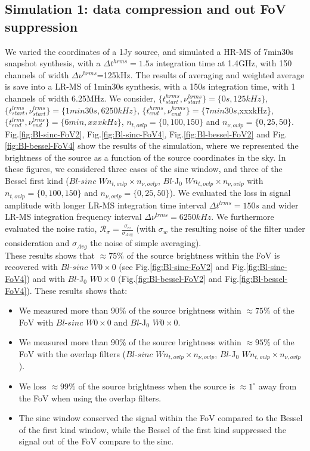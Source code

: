 \documentclass[useAMS,usenatbib]{mn2e}
\begin{document}
\subsection{Simulation 1: data compression and out FoV suppression}
We varied the coordinates of a 1Jy source, and simulated a HR-MS of 7min30s snapshot synthesis, with a $\Delta t^{hrms}=1.5s$ integration 
time at 1.4GHz,  with 150 channels of width $\Delta \nu^{hrms}$=125kHz. The results of averaging and weighted average is save into a LR-MS 
of 1min30s synthesis, with a 150s integration time,  with 1 channels of width 6.25MHz. We consider, 
$\{t^{hrms}_{start},\nu^{hrms}_{start}\}=\{0s,125kHz\}$, $\{t^{lrms}_{start},\nu^{lrms}_{start}\}=\{1min30s,6250kHz\}$, 
$\{t^{hrms}_{end},\nu^{hrms}_{end}\}=\{7min30s$,xxxkHz\}, $\{t^{lrms}_{end},\nu^{lrms}_{end}\}=\{6min,xxxkHz\}$, $n_{t,ovlp}=\{0,100,150\}$ 
and $n_{\nu,ovlp}=\{0,25,50\}$.\\
Fig.\ref{fig:Bl-sinc-FoV2}, Fig.\ref{fig:Bl-sinc-FoV4}, Fig.\ref{fig:Bl-bessel-FoV2} and Fig.\ref{fig:Bl-bessel-FoV4} show the results of 
the simulation, where we represented the brightness of the source as a function of the source coordinates in the sky. In these figures, we 
considered three cases of the sinc window, and three of the Bessel first kind ($Bl$-$sinc$ $W n_{t,ovlp} \times n_{\nu,ovlp}$, $Bl$-J$_0$ 
$W n_{t,ovlp} \times n_{\nu,ovlp}$ with  $n_{t,ovlp}=\{0,100,150\}$ and $n_{\nu,ovlp}=\{0,25,50\}$). We evaluated the loss in signal 
amplitude with longer LR-MS integration time interval $\Delta t^{lrms}=150s$ and wider LR-MS integration frequency interval $\Delta 
\nu^{lrms}=6250kHz$. We furthermore evaluated the  noise ratio, $\mathcal{R}_{\sigma}=\frac{\sigma_{w}}{\sigma_{Avg}}$ (with $\sigma_{w}$  
the resulting noise of the filter under consideration and $\sigma_{Avg}$ the noise of simple averaging).\\
These results shows that $\approx 75\%$  of the source brightness within the FoV is recovered with $Bl$-$sinc$ $W0 
\times 0$ (see Fig.\ref{fig:Bl-sinc-FoV2} and Fig.\ref{fig:Bl-sinc-FoV4}) and with $Bl$-J$_0$ $W0\times0$ (Fig.\ref{fig:Bl-bessel-FoV2} and 
Fig.\ref{fig:Bl-bessel-FoV4}). These results shows that:
\begin{itemize}
 \item We measured more than 90\% of the source brightness within $\approx 75\%$ of the FoV with $Bl$-$sinc$ $W0 \times 0$ and 
      $Bl$-J$_0$ $W0\times0$. 
 \item We measured more than 90\% of the source brightness within $\approx 95\%$ of the FoV with the overlap filters ($Bl$-$sinc$ 
     $W n_{t,ovlp} \times n_{\nu,ovlp}$, $Bl$-J$_0$ $W n_{t,ovlp} \times n_{\nu,ovlp}$).
 \item We loss $\approx 99\%$ of the source brightness when the source is $\approx 1^{\circ}$ away from the FoV when using the overlap 
filters.
  \item The sinc window conserved the signal within the FoV compared to the Bessel of the first kind window, while the Bessel of the first 
kind suppressed the signal out of the FoV compare to the sinc.
\end{itemize}
\end{document}
